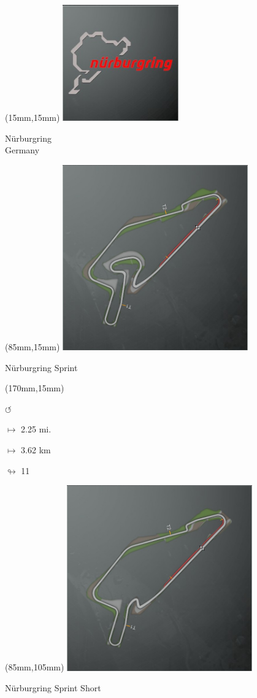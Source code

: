 \begin{textblock*}{60mm}(15mm,15mm)%
\includegraphics[width=50mm]{LG/2015-05-20_00089.png}
\par Nürburgring\\ Germany
\end{textblock*}
\begin{textblock*}{80mm}(85mm,15mm)%
\includegraphics[width=80mm]{TR/2015-05-20_00043.png}
\centerline{Nürburgring Sprint}
\end{textblock*}
\begin{textblock*}{30mm}(170mm,15mm)%
\par \Huge$\circlearrowleft$
\Large
\par$\mapsto$ 2.25 mi.
\par$\mapsto$ 3.62 km
\par$\looparrowright$ 11
\end{textblock*}
\begin{textblock*}{80mm}(85mm,105mm)%
\includegraphics[width=80mm]{TR/2015-05-20_00044.png}
\centerline{Nürburgring Sprint Short}
\end{textblock*}
